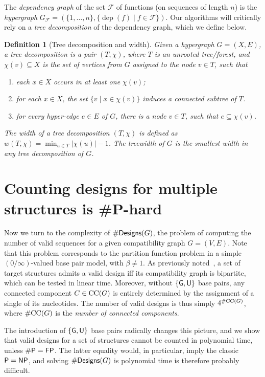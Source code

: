\documentclass{bioinfo}
\newtheorem{definition}[theorem]{Definition}
\newcommand{\dep}{\operatorname{dep}}
\newcommand{\real}{\mathbb{R}}
\newcommand{\F}{\mathcal{F}}
\newcommand{\width}{w}
\newcommand{\Def}[1]{{\it #1}}
\newcommand{\NumDesign}{\ensuremath{\#}{\sf Designs}\xspace}
\newcommand{\Nuc}[1]{{\sf #1}}
\newcommand{\Gb}{\Nuc{G}}
\newcommand{\Ub}{\Nuc{U}}
\begin{document}
The \Def{dependency graph} of the set $\F$ of functions (on
sequences of length $n$) is the \Def{hypergraph}
$G_\F=(\{1,\dots,n\} ,\{\dep(f)\mid f\in \F\})$. 
Our algorithms will critically rely on a \Def{tree decomposition} of the dependency graph, which we define below.
\begin{definition}[Tree decomposition and width]
  \label{def:treedecomp}
  Given a hypergraph $G=(X, E)$, a \Def{tree decomposition} is a
  pair $(T,\chi)$, where $T$ is an unrooted tree/forest, and
  $\chi(v)\subseteq X$ is the set of vertices from $G$ assigned to the node $v\in T$, such
  that
\begin{enumerate}
\item each $x\in X$ occurs in at least one $\chi(v)$;
\item for each $x\in X$, the set $\{ v \mid x \in \chi(v) \}$ induces a connected subtree of $T$.
\item for every hyper-edge $e\in E$ of $G$, there is a node $v\in T$, such that $e\subseteq\chi(v)$.
\end{enumerate}
The \Def{width} of a tree decomposition $(T,\chi)$ is defined as
$\width(T,\chi) = \min_{u\in T} |\chi(u)| - 1 $. The \Def{treewidth}
of $G$ is the smallest width in any tree decomposition of $G$.
\end{definition}


\section{Counting designs for multiple structures is \#{\sf P}-hard}\label{sec:counting}

Now we turn to the complexity of $\NumDesign(G)$, the problem of computing the number of valid sequences for a given compatibility graph $G=(V,E)$. Note that this problem corresponds to the partition function problem in a simple $(0/\infty)$-valued base pair model, with $\beta\neq 1$. As previously noted~\cite{Flamm2001}, a set of target structures admits a valid design iff its compatibility graph is bipartite, which can be tested in linear time.
Moreover, without $\{\Gb, \Ub\}$ base pairs, any connected component  $C\in {\rm CC}(G)$ is entirely determined by the assignment of a single of its nucleotides. The number of valid designs is thus simply $4^{\#{\rm CC}(G)}$, where $\#{\rm CC}(G)$ is the \Def{number of connected components}.

The introduction of $\{\Gb, \Ub\}$ base pairs radically changes this picture, and we show that valid designs for a set of structures cannot be counted in polynomial time, unless ${\sf\# P}={\sf FP}$. The latter equality would, in particular, imply the classic ${\sf P}={\sf NP}$, and solving $\NumDesign(G)$ is polynomial time is therefore probably difficult. 
\end{document}
